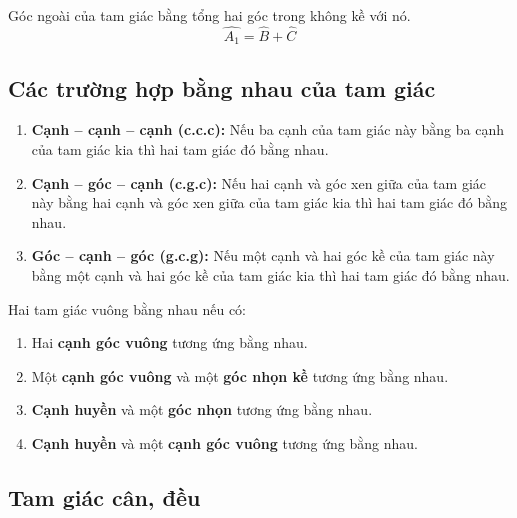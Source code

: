 \documentclass[12pt,a4paper]{article}
\begin{document}
\begin{dinhly}[title={Góc ngoài của tam giác}]
Góc ngoài của tam giác bằng tổng hai góc trong không kề với nó.
\[
  \widehat{A_1} = \widehat{B} + \widehat{C}
\]
\end{dinhly}

\subsection{Các trường hợp bằng nhau của tam giác}

\begin{dinhly}[title={Ba trường hợp bằng nhau của tam giác}]
\begin{enumerate}[label=\textbf{TH\arabic*:}, leftmargin=*, align=left]
  \item \textbf{Cạnh -- cạnh -- cạnh (c.c.c):} Nếu ba cạnh của tam giác này bằng ba cạnh của tam giác kia thì hai tam giác đó bằng nhau.
  \item \textbf{Cạnh -- góc -- cạnh (c.g.c):} Nếu hai cạnh và góc xen giữa của tam giác này bằng hai cạnh và góc xen giữa của tam giác kia thì hai tam giác đó bằng nhau.
  \item \textbf{Góc -- cạnh -- góc (g.c.g):} Nếu một cạnh và hai góc kề của tam giác này bằng một cạnh và hai góc kề của tam giác kia thì hai tam giác đó bằng nhau.
\end{enumerate}
\end{dinhly}

\begin{dinhly}[title={Các trường hợp bằng nhau của tam giác vuông}]
Hai tam giác vuông bằng nhau nếu có:
\begin{enumerate}[label=\textbf{TH\arabic*:}, leftmargin=*, align=left]
  \item Hai \textbf{cạnh góc vuông} tương ứng bằng nhau.
  \item Một \textbf{cạnh góc vuông} và một \textbf{góc nhọn kề} tương ứng bằng nhau.
  \item \textbf{Cạnh huyền} và một \textbf{góc nhọn} tương ứng bằng nhau.
  \item \textbf{Cạnh huyền} và một \textbf{cạnh góc vuông} tương ứng bằng nhau.
\end{enumerate}
\end{dinhly}

\subsection{Tam giác cân, đều}
\end{document}
